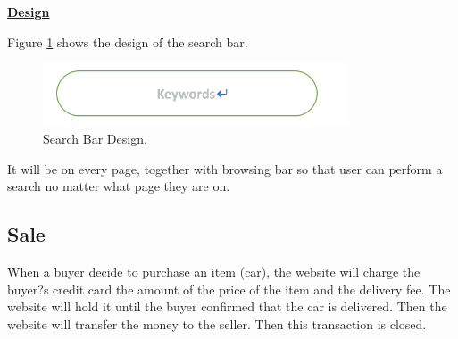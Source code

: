 \documentclass[12pt]{article}
\begin{document}
\par \textbf{\underline{Design}}
\par Figure \ref{search_bar} shows the design of the search bar.
\begin{figure}[!h]
\caption{Search Bar Design.} \label{search_bar}
\begin{center}
\includegraphics[width=9cm]{search_bar}
\end{center}
\end{figure}
\par It will be on every page, together with browsing bar so that user can perform a search no matter what page they are on.

\subsection{Sale}
When a buyer decide to purchase an item (car), the website will charge the buyer?s credit card the amount of the price of the item and the delivery fee.  The website will hold it until the buyer confirmed that the car is delivered. Then the website will transfer the money to the seller. Then this transaction is closed.
\end{document}
